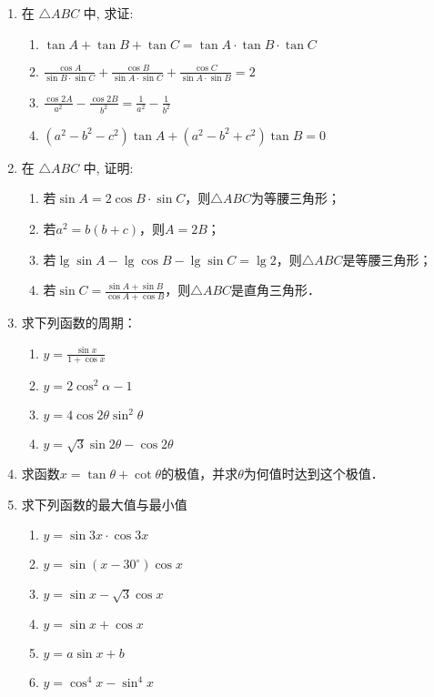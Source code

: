 \begin{enumerate}
\item 在 $\triangle A B C$ 中, 求证:
\begin{enumerate}
    \item $\tan  A+\tan  B+\tan  C=\tan  A \cdot \tan  B \cdot \tan  C$
    \item $\frac{\cos A}{\sin B \cdot \sin C}+\frac{\cos B}{\sin A \cdot \sin C}+\frac{\cos C}{\sin A \cdot \sin B}=2$
    \item $\frac{\cos 2 A}{a^{2}}-\frac{\cos 2 B}{b^{2}}=\frac{1}{a^{2}}-\frac{1}{b^{2}}$
    \item $\left(a^{2}-b^{2}-c^{2}\right) \tan  A+\left(a^{2}-b^{2}+c^{2}\right) \tan  B=0$
\end{enumerate}


\item 在 $\triangle A B C$ 中, 证明:
\begin{enumerate}
    \item 若$\sin A=2\cos B\cdot \sin C$，则$\triangle A B C$为等腰三角形；
    \item 若$a^2=b(b+c)$，则$A=2B$；
    \item 若$\lg\sin A-\lg\cos B-\lg\sin C=\lg2$，则$\triangle A B C$是等腰三角形；
    \item 若$\sin C=\frac{\sin A+\sin B}{\cos A+\cos B}$，则$\triangle A B C$是直角三角形．
\end{enumerate}
\item 求下列函数的周期：
\begin{multicols}{2}
\begin{enumerate}
    \item $y=\frac{\sin x}{1+\cos x}$
    \item $y=2 \cos ^{2} \alpha-1$
    \item $y=4 \cos 2 \theta \sin ^{2} \theta$
    \item $y=\sqrt{3} \sin 2 \theta-\cos 2 \theta$
\end{enumerate}    
\end{multicols}

\item 求函数$x=\tan\theta+\cot\theta$的极值，并求$\theta$为何值时达到这个极值．
\item 求下列函数的最大值与最小值
\begin{multicols}{2}
\begin{enumerate}
    \item $y=\sin 3 x \cdot \cos 3 x$
    \item $y=\sin \left(x-30^{\circ}\right) \cos x$
    \item $y=\sin x-\sqrt{3} \cos x$
\item $y=\sin x+\cos x$
\item $y=a \sin x+b$
\item $y=\cos ^{4} x-\sin ^{4} x$
\end{enumerate}    
\end{multicols}



\end{enumerate}
